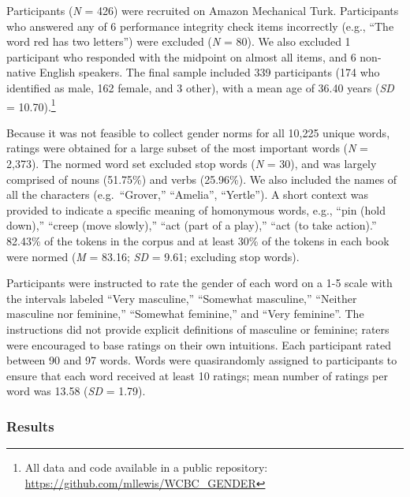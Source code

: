 \documentclass[
  english,
  ,man,floatsintext]{apa6}
\begin{document}
Participants (\emph{N} = 426) were recruited on Amazon Mechanical Turk. Participants who answered any of 6 performance integrity check items incorrectly (e.g., \enquote{The word red has two letters}) were excluded (\emph{N} = 80). We also excluded 1 participant who responded with the midpoint on almost all items, and 6 non-native English speakers. The final sample included 339 participants (174 who identified as male, 162 female, and 3 other), with a mean age of 36.40 years (\emph{SD} = 10.70).\footnote{All data and code available in a public repository: \url{https://github.com/mllewis/WCBC_GENDER}}

Because it was not feasible to collect gender norms for all 10,225 unique words, ratings were obtained for a large subset of the most important words (\emph{N} = 2,373). The normed word set excluded stop words (\emph{N} = 30), and was largely comprised of nouns (51.75\%) and verbs (25.96\%). We also included the names of all the characters (e.g.~\enquote{Grover,} \enquote{Amelia}, \enquote{Yertle}). A short context was provided to indicate a specific meaning of homonymous words, e.g., \enquote{pin (hold down),} \enquote{creep (move slowly),} \enquote{act (part of a play),} \enquote{act (to take action).} 82.43\% of the tokens in the corpus and at least 30\% of the tokens in each book were normed (\emph{M} = 83.16; \emph{SD} = 9.61; excluding stop words).

Participants were instructed to rate the gender of each word on a 1-5 scale with the intervals labeled \enquote{Very masculine,} \enquote{Somewhat masculine,} \enquote{Neither masculine nor feminine,} \enquote{Somewhat feminine,} and \enquote{Very feminine}. The instructions did not provide explicit definitions of masculine or feminine; raters were encouraged to base ratings on their own intuitions. Each participant rated between 90 and 97 words. Words were quasirandomly assigned to participants to ensure that each word received at least 10 ratings; mean number of ratings per word was 13.58 (\emph{SD} = 1.79).

\hypertarget{results}{%
\subsubsection{Results}\label{results}}
\end{document}
